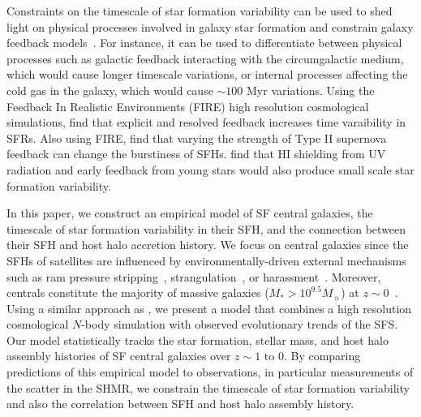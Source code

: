 \documentclass[12pt, letterpaper, preprint, tighten]{aastex62}
\begin{document}
Constraints on the timescale of star formation variability can be used to
shed light on physical processes involved in galaxy star formation and
constrain galaxy feedback models~\citep{sparre2015}. For instance,
it can be used to differentiate between physical processes such
as galactic feedback interacting with the circumgalactic medium, which
would cause longer timescale variations, or internal processes affecting
the cold gas in the galaxy, which would cause $\sim 100$ Myr variations.
Using the Feedback In Realistic Environments (FIRE) high resolution
cosmological simulations, \cite{hopkins2014} find that
explicit and resolved feedback increases time varaibility in SFRs.
Also using FIRE, \cite{sparre2017} find that varying the strength of
Type II supernova feedback can change the burstiness of SFHs.
\cite{governato2015} find that HI shielding from UV radiation and
early feedback from young stars would also produce small scale star
formation variability.

In this paper, we construct an empirical model of SF central galaxies,
the timescale of star formation variability in their
SFH, and the connection between their SFH and host halo accretion history.
We focus on central galaxies since the SFHs of satellites are influenced
by environmentally-driven external mechanisms such as ram pressure
stripping~\citep{gunn1972,bekki2009}, strangulation~\citep{larson1980, peng2015},
or harassment~\citep{moore1998}. Moreover, centrals constitute the majority
of massive galaxies ($M_*>10^{9.5}M_\sun$) at $z\sim0$~\citep{wetzel2013}.
Using a similar approach as \cite{wetzel2013, hahn2017b}, we present a model
that combines a high resolution cosmological $N$-body simulation with
observed evolutionary trends of the SFS. Our model statistically tracks
the star formation, stellar mass, and host halo assembly histories of SF
central galaxies over $z\sim1$ to $0$. By comparing predictions of this empirical
model to observations, in particular measurements of the scatter in the
SHMR, we constrain the timescale of star formation variability and also
the correlation between SFH and host halo assembly history.
\end{document}
